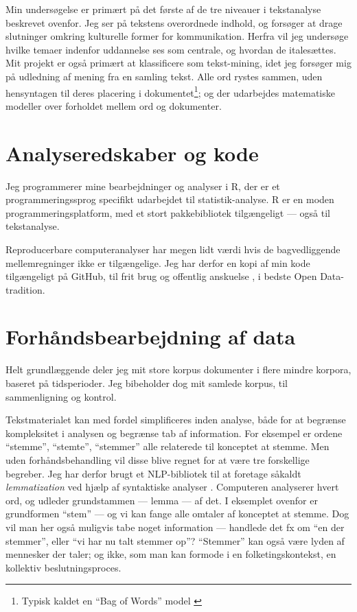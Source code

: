 Min undersøgelse er primært på det første af de tre niveauer i tekstanalyse beskrevet ovenfor.
Jeg ser på tekstens overordnede indhold, og forsøger at drage slutninger omkring kulturelle former for kommunikation.
Herfra vil jeg undersøge hvilke temaer indenfor uddannelse ses som centrale, og hvordan de italesættes.
Mit projekt er også primært at klassificere som tekst-mining, idet jeg forsøger mig på udledning af mening fra en samling tekst.
Alle ord rystes sammen, uden hensyntagen til deres placering i dokumentet\footnote{Typisk kaldet en “Bag of Words” model \autocite[s. 28]{kwartlerTextMiningPractice2017}}; og der udarbejdes matematiske modeller over forholdet mellem ord og dokumenter.

\section{Analyseredskaber og kode}

Jeg programmerer mine bearbejdninger og analyser i R, der er et programmeringssprog specifikt udarbejdet til statistik-analyse\autocite{therfoundationWhat}.
R er en moden programmeringsplatform, med et stort pakkebibliotek tilgængeligt — også til tekstanalyse.

Reproducerbare computeranalyser har megen lidt værdi hvis de bagvedliggende mellemregninger ikke er tilgængelige.
Jeg har derfor en kopi af min kode tilgængeligt på GitHub, til frit brug og offentlig anskuelse \autocite{andersenNorseghostMasterthesis2020}, i bedste Open Data-tradition.

\section{Forhåndsbearbejdning af data}\label{sec:preproc}

Helt grundlæggende deler jeg mit store korpus dokumenter i flere mindre korpora, baseret på tidsperioder.
Jeg bibeholder dog mit samlede korpus, til sammenligning og kontrol.

Tekstmaterialet kan med fordel simplificeres inden analyse, både for at begrænse kompleksitet i analysen og begrænse tab af information.
For eksempel er ordene “stemme”, “stemte”, “stemmer” alle relaterede til konceptet at stemme.
Men uden forhåndsbehandling vil disse blive regnet for at være tre forskellige begreber.
Jeg har derfor brugt et NLP-bibliotek \autocite{strakaUDPipeUFAL2020} til at foretage såkaldt \textit{lemmatization} ved hjælp af syntaktiske analyser \autocite[s. 28]{kwartlerTextMiningPractice2017}.
Computeren analyserer hvert ord, og udleder grundstammen --- lemma — af det. I eksemplet ovenfor er grundformen “stem” — og vi kan fange alle omtaler af konceptet at stemme.
Dog vil man her også muligvis tabe noget information — handlede det fx om “en der stemmer”, eller “vi har nu talt stemmer op”?
“Stemmer” kan også være lyden af mennesker der taler; og ikke, som man kan formode i en folketingskontekst, en kollektiv beslutningsproces.

